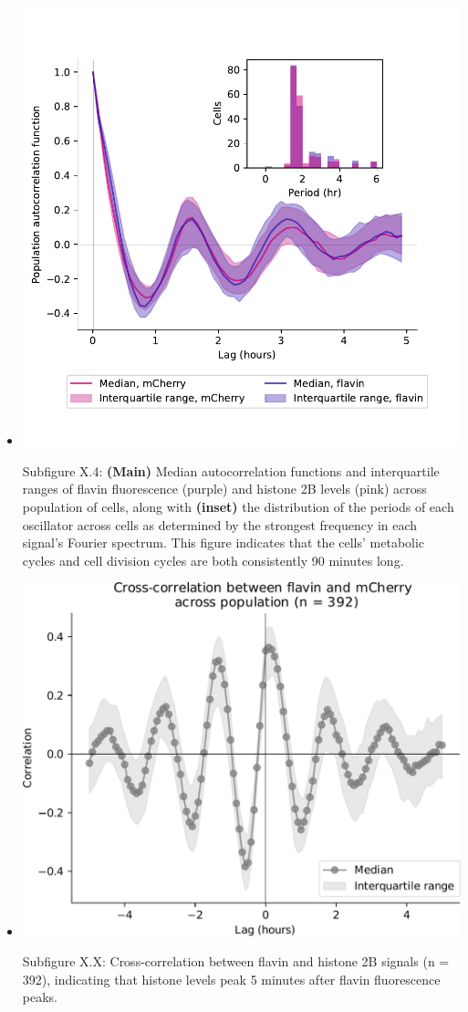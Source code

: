 \begin{itemize}
\begin{itemize}
\item \begin{center}
\includegraphics[width=.9\linewidth]{acf_and_histogram.pdf}
\end{center} Subfigure X.4: \textbf{(Main)} Median autocorrelation functions and interquartile ranges of flavin fluorescence (purple) and histone 2B levels (pink) across population of cells, along with \textbf{(inset)} the distribution of the periods of each oscillator across cells as determined by the strongest frequency in each signal's Fourier spectrum.  This figure indicates that the cells' metabolic cycles and cell division cycles are both consistently 90 minutes long.
\end{itemize}

\begin{itemize}
\item \begin{center}
\includegraphics[width=.9\linewidth]{xcf_edit.pdf}
\end{center} Subfigure X.X: Cross-correlation between flavin and histone 2B signals (n = 392), indicating that histone levels peak 5 minutes after flavin fluorescence peaks.
\end{itemize}
\end{itemize}

